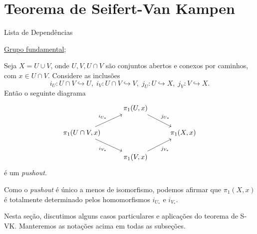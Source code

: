 \section{Teorema de Seifert-Van Kampen}
\label{teorema-de-seifert-van-kampen}

\begin{titlemize}{Lista de Dependências}
	\item \hyperref[grupo-fundamental]{Grupo fundamental};\\ %
\end{titlemize}

\begin{thm}
    Seja $X=U\cup V$, onde $U,V,U\cap V$ são conjuntos abertos e conexos por caminhos, com $x\in U\cap V$. Considere as inclusões 
    \[i_U:U\cap V\hookrightarrow U,\;i_V:U\cap V\hookrightarrow V,\;j_U:U\hookrightarrow X,\;j_V:V\hookrightarrow X.\] 
    Então o seguinte diagrama 
\[\begin{tikzcd}
	& {\pi_1(U,x)} \\
	{\pi_1(U\cap V,x)} && {\pi_1(X,x)} \\
	& {\pi_1(V,x)}
	\arrow["{j_{U_*}}", from=1-2, to=2-3]
	\arrow["{i_{U_*}}", from=2-1, to=1-2]
	\arrow["{i_{V_*}}"', from=2-1, to=3-2]
	\arrow["{j_{V_*}}"', from=3-2, to=2-3]
\end{tikzcd}\]
é um \emph{pushout}.
\end{thm}
Como o \emph{pushout} é único a menos de isomorfismo, podemos afirmar que $\pi_1(X,x)$ é totalmente determinado pelos homomorfismos $i_{U_*}$ e $i_{V_*}$.

Nesta seção, discutimos alguns casos particulares e aplicações do teorema de S-VK. Manteremos as notações acima em todas as subseções.





